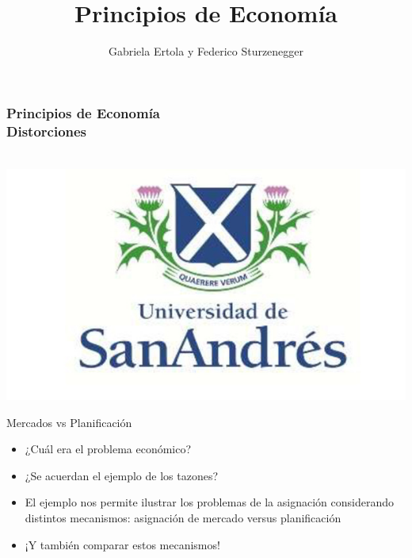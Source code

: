 \documentclass{beamer}
\title[Principios de Economía]{Principios de Economía}
\date{}
\author[Ertola y Sturzenegger]{Gabriela Ertola y Federico Sturzenegger }
\institute[]{Universidad de San Andrés \\
2022}
\begin{document}
\begin{frame}
\frametitle{Principios de Economía
\centering
\\ \vspace{12mm} Distorciones}
\centering
 \\ \vspace{12mm} %
\includegraphics[scale=0.25]{Figures/logoUDESA.jpg} 
\end{frame}


\begin{frame}{Mercados vs Planificación}
    
    \begin{itemize}
        \item ¿Cuál era el problema económico?
        \item ¿Se acuerdan el ejemplo de los tazones? 
        \vspace{1mm}
        \item El ejemplo nos permite ilustrar los problemas de la asignación considerando distintos mecanismos: asignación de mercado versus planificación
        \vspace{1mm}
        \item ¡Y también comparar estos mecanismos! 
    \end{itemize}
\end{frame}
\end{document}
